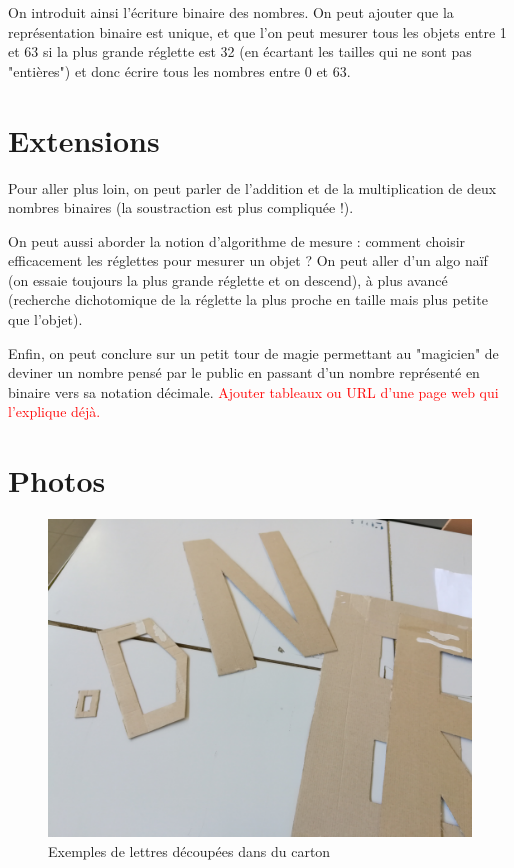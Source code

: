 \documentclass[a4paper,12pt]{scrartcl}
\begin{document}
On introduit ainsi l'écriture binaire des nombres.
On peut ajouter que la représentation binaire est unique, et que l'on peut mesurer tous les objets entre 1 et 63 si la plus grande réglette est 32 (en écartant les tailles qui ne sont pas "entières") et donc écrire tous les nombres entre 0 et 63.


\section{Extensions}

Pour aller plus loin, on peut parler de l'addition et de la multiplication de deux nombres binaires (la soustraction est plus compliquée !).

On peut aussi aborder la notion d'algorithme de mesure : comment choisir efficacement les réglettes pour mesurer un objet ? On peut aller d'un algo naïf (on essaie toujours la plus grande réglette et on descend), à plus avancé (recherche dichotomique de la réglette la plus proche en taille mais plus petite que l'objet).

Enfin, on peut conclure sur un petit tour de magie permettant au "magicien" de deviner un nombre pensé par le public en passant d'un nombre représenté en binaire vers sa notation décimale.
\textcolor{red}{Ajouter tableaux ou URL d'une page web qui l'explique déjà.}



\section{Photos}

\begin{figure}
\begin{center}
\includegraphics[width=0.7\linewidth]{images/lettres.jpg} 
\end{center}
\caption{Exemples de lettres découpées dans du carton}
\label{fig:lettres}
\end{figure}
\end{document}
